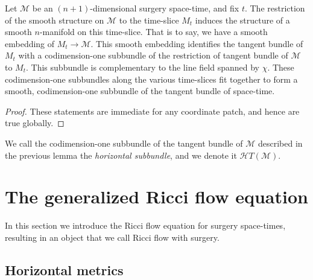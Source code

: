 \begin{lemma}
\label{lem:time-slice-smooth-manifold}
Let ${\mathcal M}$ be an $(n+1)$-dimensional surgery space-time, and fix $t$.
The restriction of the smooth structure on ${\mathcal M}$ to the time-slice
$M_{t}$ induces the structure of a smooth $n$-manifold on this time-slice. That
is to say, we have a smooth embedding of $M_{t}\to {\mathcal M}$. This smooth
embedding identifies the tangent bundle of $M_{t}$ with a codimension-one
subbundle of the restriction  of tangent bundle of ${\mathcal M}$ to $M_{t}$.
This subbundle is complementary to the line field spanned by $\chi$. These
codimension-one subbundles along the various time-slices fit together to form
a smooth, codimension-one subbundle of the tangent bundle of space-time.
 \end{lemma}


\begin{proof}
These statements are immediate for any coordinate patch, and hence
are true globally.
\end{proof}

\begin{definition}
\label{def:horizontal-subbundle}
We call the codimension-one subbundle of the tangent bundle of
${\mathcal M}$ described in the previous lemma  the {\em horizontal
subbundle}, and we denote it
${\mathcal HT}({\mathcal M})$.
\end{definition}

\section{The generalized Ricci flow equation}

In this section we introduce the Ricci flow equation for surgery
space-times, resulting in an object that we call Ricci flow with
surgery.

\subsection{Horizontal metrics}

